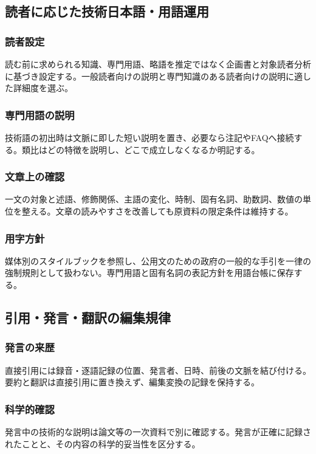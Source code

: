 \documentclass[a4paper,11pt]{article}
\begin{document}
\subsection{読者に応じた技術日本語・用語運用}
\subsubsection{読者設定}
\par 読む前に求められる知識、専門用語、略語を推定ではなく企画書と対象読者分析に基づき設定する。一般読者向けの説明と専門知識のある読者向けの説明に適した詳細度を選ぶ。\par\medskip
\subsubsection{専門用語の説明}
\par 技術語の初出時は文脈に即した短い説明を置き、必要なら注記やFAQへ接続する。類比はどの特徴を説明し、どこで成立しなくなるか明記する。\par\medskip
\subsubsection{文章上の確認}
\par 一文の対象と述語、修飾関係、主語の変化、時制、固有名詞、助数詞、数値の単位を整える。文章の読みやすさを改善しても原資料の限定条件は維持する。\par\medskip
\subsubsection{用字方針}
\par 媒体別のスタイルブックを参照し、公用文のための政府の一般的な手引を一律の強制規則として扱わない。専門用語と固有名詞の表記方針を用語台帳に保存する。\par\medskip
\subsection{引用・発言・翻訳の編集規律}
\subsubsection{発言の来歴}
\par 直接引用には録音・逐語記録の位置、発言者、日時、前後の文脈を結び付ける。要約と翻訳は直接引用に置き換えず、編集変換の記録を保持する。\par\medskip
\subsubsection{科学的確認}
\par 発言中の技術的な説明は論文等の一次資料で別に確認する。発言が正確に記録されたことと、その内容の科学的妥当性を区分する。\par\medskip
\end{document}
